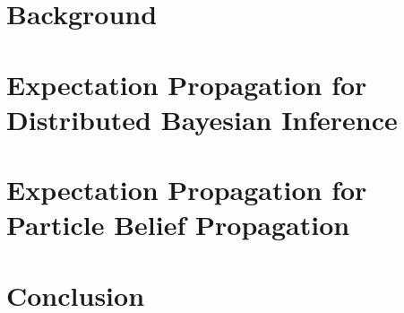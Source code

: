 \chapter{Background}

\ifbgm\fi

\chapter[Expectation Propagation for Distributed Bayesian Inference]{\label{chap:EPforDBI}Expectation Propagation for\\ Distributed Bayesian Inference}
\ifsnep\fi

\chapter[Expectation Propagation for Particle Belief Propagation]{\label{chap:EPBP}Expectation Propagation for\\ Particle Belief Propagation}

\ifpbp\fi


\chapter{Conclusion}

\ifccl\fi


\begin{appendices}
\chapter{}


\end{appendices}



\newpage
\renewcommand{\bibname}{References}

\singlespacing
\begin{small}

\end{small}


